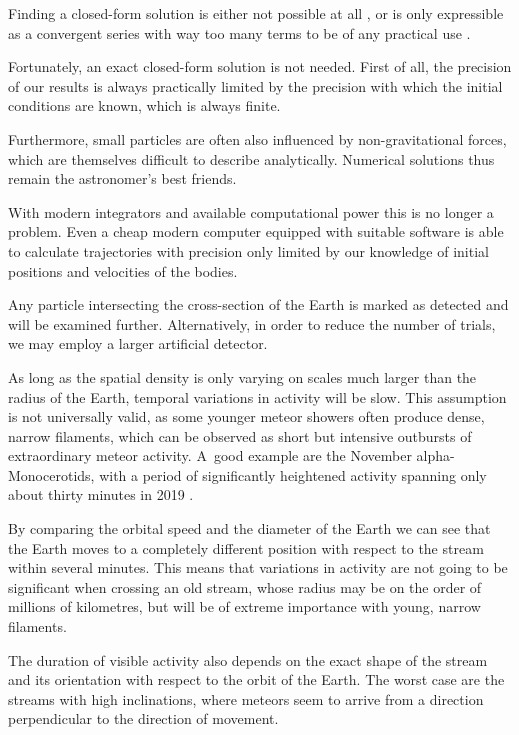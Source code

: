         Finding a closed-form solution is either not possible at all \cite{...}, or is only expressible
        as a convergent series with way too many terms to be of any practical use \citep{beloriszky-1930}.

        Fortunately, an exact closed-form solution is not needed. First of all, the precision of our results
        is always practically limited by the precision with which the initial conditions are known,
        which is always finite.

        Furthermore, small particles are often also influenced by non-gravitational forces,
        which are themselves difficult to describe analytically.
        Numerical solutions thus remain the astronomer's best friends.

        With modern integrators and available computational power this is no longer a problem.
        Even a cheap modern computer equipped with suitable software is able to calculate trajectories
        with precision only limited by our knowledge of initial positions and velocities of the bodies.


    Any particle intersecting the cross-section of the Earth is marked as detected and will be examined further.
    Alternatively, in order to reduce the number of trials, we may employ a larger artificial detector.


    As long as the spatial density is only varying on scales much larger than the radius of the Earth,
    temporal variations in activity will be slow.
    This assumption is not universally valid, as some younger meteor showers often produce dense, narrow filaments,
    which can be observed as short but intensive outbursts of extraordinary meteor activity.
    A~good example are the November alpha-Monocerotids, with a period of significantly
    heightened activity spanning only about thirty minutes in 2019 \citep{CBET4692}.

    By comparing the orbital speed and the diameter of the Earth we can see that the Earth moves
    to a completely different position with respect to the stream within several minutes.
    This means that variations in activity are not going to be significant when crossing an old stream,
    whose radius may be on the order of millions of kilometres, but will be of extreme importance with young, narrow filaments.

    The duration of visible activity also depends on the exact shape of the stream and its orientation with respect to the orbit of the Earth.
    The worst case are the streams with high inclinations, where meteors seem to arrive from a direction perpendicular
    to the direction of movement.



